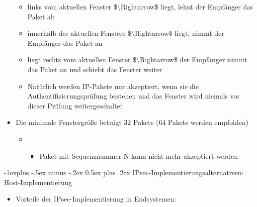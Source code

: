 \documentclass[a4paper]{article}
\makeatletter
\renewcommand{\subsection}{\@startsection{subsection}{2}{0mm}%
 {-1explus -.5ex minus -.2ex}%
 {0.5ex plus .2ex}%
 {\normalfont\normalsize\bfseries}}
\makeatother
\begin{document}
\begin{multicols}{3}
\begin{itemize}
              \begin{itemize}
                  \item
                        links vom aktuellen Fenster \$\textbackslash Rightarrow\$ liegt,
                        lehnt der Empfänger das Paket ab
                  \item
                        innerhalb des aktuellen Fensters \$\textbackslash Rightarrow\$
                        liegt, nimmt der Empfänger das Paket an
                  \item
                        liegt rechts vom aktuellen Fenster \$\textbackslash Rightarrow\$ der
                        Empfänger nimmt das Paket an und schiebt das Fenster weiter
                  \item
                        Natürlich werden IP-Pakete nur akzeptiert, wenn sie die
                        Authentifizierungsprüfung bestehen und das Fenster wird niemals vor
                        dieser Prüfung weitergeschaltet
              \end{itemize}
        \item
              Die minimale Fenstergröße beträgt 32 Pakete (64 Pakete werden
              empfohlen)

              \begin{itemize}
                  \item

                        \begin{itemize}
                            \item
                                  Paket mit Sequenznummer N kann nicht mehr akzeptiert werden
                        \end{itemize}
              \end{itemize}
    \end{itemize}


    \subsection{IPsec-Implementierungsalternativen:
        Host-Implementierung}

    \begin{itemize}
        \item
              Vorteile der IPsec-Implementierung in Endsystemen:


\end{itemize}
\end{multicols}
\end{document}
